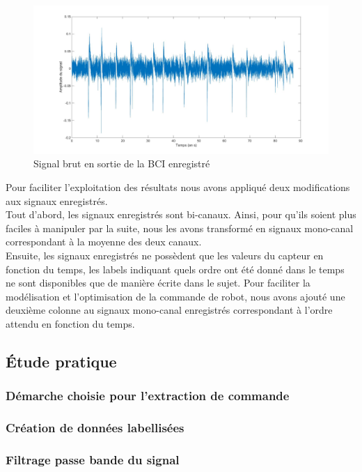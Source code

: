 \documentclass[11pt]{article}
\begin{document}
\begin{figure}[!h]
	\includegraphics[scale=0.25]{images/signalBCIinit.jpg}
	\caption{Signal brut en sortie de la BCI enregistré}
	\label{fig:duck}
\end{figure}

Pour faciliter l'exploitation des résultats nous avons appliqué deux modifications aux signaux enregistrés. \\

Tout d'abord, les signaux enregistrés sont bi-canaux. Ainsi, pour qu'ils soient plus faciles à manipuler par la suite, nous les avons transformé en signaux mono-canal correspondant à la moyenne des deux canaux. \\

Ensuite, les signaux enregistrés ne possèdent que les valeurs du capteur en fonction du temps, les labels indiquant quels ordre ont été donné dans le temps ne sont disponibles que de manière écrite dans le sujet. Pour faciliter la modélisation et l'optimisation de la commande de robot, nous avons ajouté une deuxième colonne au signaux mono-canal enregistrés correspondant à l'ordre attendu en fonction du temps.

\cleardoublepage

\subsection{Étude pratique}
\subsubsection{Démarche choisie pour l'extraction de commande}
\subsubsection{Création de données labellisées}
\subsubsection{Filtrage passe bande du signal}
\end{document}
